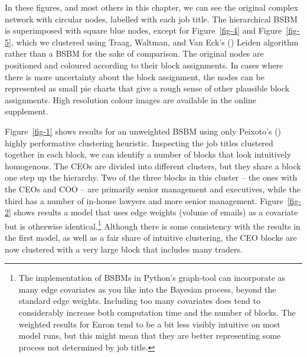 \documentclass[
  12pt,
  a4paper,
  DIV=11,
  numbers=noendperiod,
  twoside,
  open=any]{scrartcl}
\begin{document}
In these figures, and most others in this chapter, we can see the
original complex network with circular nodes, labelled with each job
title. The hierarchical BSBM is superimposed with square blue nodes,
except for Figure~\ref{fig-4} and Figure~\ref{fig-5}, which we clustered
using Traag, Waltman, and Van Eck's
() Leiden algorithm rather than a
BSBM for the sake of comparison. The original nodes are positioned and
coloured according to their block assignments. In cases where there is
more uncertainty about the block assignment, the nodes can be
represented as small pie charts that give a rough sense of other
plausible block assignments. High resolution colour images are available
in the online supplement.

Figure~\ref{fig-1} shows results for an unweighted BSBM using only
Peixoto's () highly
performative clustering heuristic. Inspecting the job titles clustered
together in each block, we can identify a number of blocks that look
intuitively homogenous. The CEOs are divided into different clusters,
but they share a block one step up the hierarchy. Two of the three
blocks in this cluster -- the ones with the CEOs and COO -- are
primarily senior management and executives, while the third has a number
of in-house lawyers and more senior management. Figure~\ref{fig-2} shows
results a model that uses edge weights (volume of emails) as a covariate
but is otherwise identical.\footnote{The implementation of BSBMs in
  Python's graph-tool can incorporate as many edge covariates as you
  like into the Bayesian process, beyond the standard edge weights.
  Including too many covariates does tend to considerably increase both
  computation time and the number of blocks. The weighted results for
  Enron tend to be a bit less visibly intuitive on most model runs, but
  this might mean that they are better representing some process not
  determined by job title.} Although there is some consistency with the
results in the first model, as well as a fair share of intuitive
clustering, the CEO blocks are now clustered with a very large block
that includes many traders.
\end{document}
